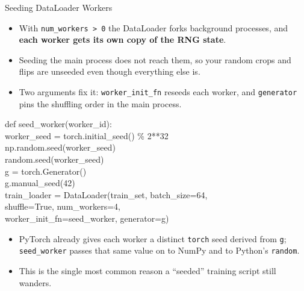 \begin{frame}[allowframebreaks]{Seeding DataLoader Workers}
\begin{itemize}
    \item With \texttt{num\_workers > 0} the DataLoader forks background processes, and \textbf{each worker gets its own copy of the RNG state}.
    \item Seeding the main process does not reach them, so your random crops and flips are unseeded even though everything else is.
    \item Two arguments fix it: \texttt{worker\_init\_fn} reseeds each worker, and \texttt{generator} pins the shuffling order in the main process.
\end{itemize}

\framebreak
    \ttfamily\footnotesize{
    def seed\_worker(worker\_id): \\
    \hspace{1em}    worker\_seed = torch.initial\_seed() \% 2**32 \\
    \hspace{1em}    np.random.seed(worker\_seed) \\
    \hspace{1em}    random.seed(worker\_seed) \\

    g = torch.Generator() \\
    g.manual\_seed(42) \\

    train\_loader = DataLoader(train\_set, batch\_size=64, \\
    \hspace{6em}      shuffle=True, num\_workers=4, \\
    \hspace{6em}      worker\_init\_fn=seed\_worker, generator=g)
    }
\vspace{1em}
\begin{itemize}
    \item PyTorch already gives each worker a distinct \texttt{torch} seed derived from \texttt{g}; \texttt{seed\_worker} passes that same value on to NumPy and to Python's \texttt{random}.
    \item This is the single most common reason a ``seeded'' training script still wanders.
\end{itemize}
\end{frame}

